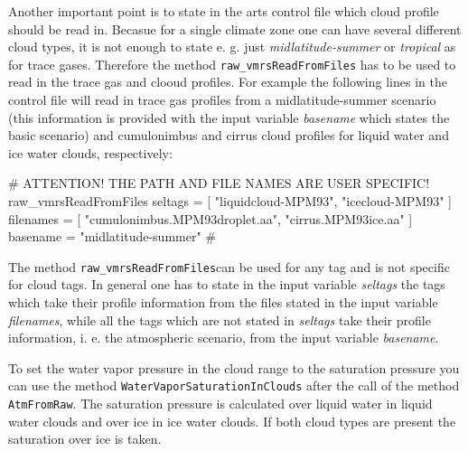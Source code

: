 Another important point is to state in the arts control file which
cloud profile should be read in. Becasue for a single climate zone one
can have several different cloud types, it is not enough to state 
e. g. just {\it midlatitude-summer} or {\it tropical} as for 
trace gases. Therefore the method {\tt raw\_vmrsReadFromFiles} has to 
be used to read in the trace gas and clooud profiles. For example 
the following lines in the control file will read in trace gas 
profiles from a midlatitude-summer scenario (this information is
provided with the input variable {\it basename} which states the 
basic scenario) and cumulonimbus and cirrus cloud profiles for 
liquid water and ice water clouds, respectively:
\begin{code}
# ATTENTION! THE PATH AND FILE NAMES ARE USER SPECIFIC!
raw_vmrsReadFromFiles
  {seltags   = [ "liquidcloud-MPM93", 
                 "icecloud-MPM93" ]
   filenames = [ "cumulonimbus.MPM93droplet.aa",
                 "cirrus.MPM93ice.aa" ]
   basename  =   "midlatitude-summer"
  }
#
\end{code}
The method {\tt raw\_vmrsReadFromFiles}can be used for any tag and 
is not specific for cloud tags. In general one has to state in the 
input variable {\it seltags} the tags which take their profile 
information from the files stated in the input variable 
{\it filenames}, while all the tags which are not stated in 
{\it seltags} take their profile information, i. e. the atmospheric 
scenario, from the input variable {\it basename}. 

To set the water vapor pressure in the cloud range to the saturation 
pressure you can use the method {\tt WaterVaporSaturationInClouds{}}
after the call of the method {\tt AtmFromRaw{}}. The saturation
pressure is calculated over liquid water in liquid water clouds and
over ice in ice water clouds. If both cloud types are present the
saturation over ice is taken.


